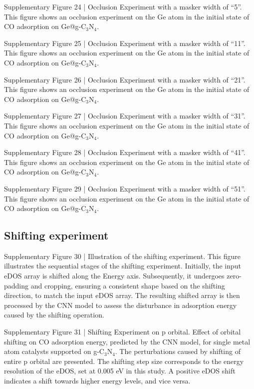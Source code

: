 Supplementary Figure 24 | Occlusion Experiment with a masker width of “5”. This figure shows an occlusion experiment on the Ge atom in the initial state of CO adsorption on Ge@g-C$_3$N$_4$.

Supplementary Figure 25 | Occlusion Experiment with a masker width of “11”. This figure shows an occlusion experiment on the Ge atom in the initial state of CO adsorption on Ge@g-C$_3$N$_4$.


Supplementary Figure 26 | Occlusion Experiment with a masker width of “21”. This figure shows an occlusion experiment on the Ge atom in the initial state of CO adsorption on Ge@g-C$_3$N$_4$.

Supplementary Figure 27 | Occlusion Experiment with a masker width of “31”. This figure shows an occlusion experiment on the Ge atom in the initial state of CO adsorption on Ge@g-C$_3$N$_4$.


Supplementary Figure 28 | Occlusion Experiment with a masker width of “41”. This figure shows an occlusion experiment on the Ge atom in the initial state of CO adsorption on Ge@g-C$_3$N$_4$.

Supplementary Figure 29 | Occlusion Experiment with a masker width of “51”. This figure shows an occlusion experiment on the Ge atom in the initial state of CO adsorption on Ge@g-C$_3$N$_4$.


\subsection{Shifting experiment}

Supplementary Figure 30 | Illustration of the shifting experiment. This figure illustrates the sequential stages of the shifting experiment. Initially, the input eDOS array is shifted along the Energy axis. Subsequently, it undergoes zero-padding and cropping, ensuring a consistent shape based on the shifting direction, to match the input eDOS array. The resulting shifted array is then processed by the CNN model to assess the disturbance in adsorption energy caused by the shifting operation.


Supplementary Figure 31 | Shifting Experiment on p orbital. Effect of orbital shifting on CO adsorption energy, predicted by the CNN model, for single metal atom catalysts supported on g-C$_3$N$_4$. The perturbations caused by shifting of entire p orbital are presented. The shifting step size corresponds to the energy resolution of the eDOS, set at 0.005 eV in this study. A positive eDOS shift indicates a shift towards higher energy levels, and vice versa.

